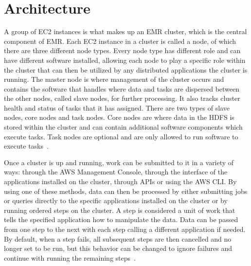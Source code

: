 \section{Architecture}

A group of EC2 instances is what makes up an EMR cluster, which is the central 
component of EMR. Each EC2 instance in a cluster is called a node, of which 
there are three different node types. Every node type has different role and 
can have different software installed, allowing each node to play a specific 
role within the cluster that can then be utilized by any distributed 
applications the cluster is running. The master node is where management of 
the cluster occurs and contains the software that handles where data and tasks 
are dispersed between the other nodes, called slave nodes, for further 
processing. It also tracks cluster health and status of tasks that it has 
assigned. There are two types of slave nodes, core nodes and task nodes. Core 
nodes are where data in the HDFS is stored within the cluster and can contain 
additional software components which execute tasks. Task nodes are optional 
and are only allowed to run software to execute 
tasks~\cite{hid-sp18-521-amazonemr-overview}. 

Once a cluster is up and running, work can be submitted to it in a variety 
of ways: through the AWS Management Console, through the interface of the 
applications installed on the cluster, through APIs or using the AWS CLI. 
By using one of these methods, data can then be processed by either submitting 
jobs or queries directly to the specific applications installed on the cluster 
or by running ordered steps on the cluster. A step is considered a unit of 
work that tells the specified application how to manipulate the data. Data can 
be passed from one step to the next with each step calling a different 
application if needed. By default, when a step fails, all subsequent steps are 
then cancelled and no longer set to be run, but this behavior can be changed 
to ignore failures and continue with running the remaining 
steps~\cite{hid-sp18-521-amazonemr-overview}. 


